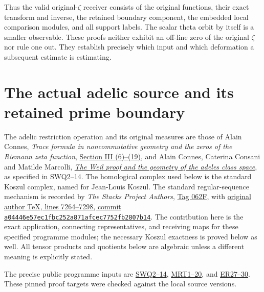 \documentclass[11pt]{article}
\begin{document}
Thus the valid original-$\zeta$ receiver consists of the original
functions, their exact transform and inverse, the retained boundary
component, the embedded local comparison modules, and all support
labels. The scalar theta orbit by itself is a smaller observable.
These proofs neither exhibit an off-line zero of the original
$\zeta$ nor rule one out. They establish precisely which input and
which deformation a subsequent estimate is estimating.

\clearpage

\section{The actual adelic source and its retained prime boundary}
\label{sec:independent-adelic-coinvariant-bridge}

The adelic restriction operation and its original measures are those of
Alain Connes, \emph{Trace formula in noncommutative geometry and the zeros
of the Riemann zeta function},
\href{https://arxiv.org/abs/math/9811068v1}{Section III (6)--(19)},
and Alain Connes, Caterina Consani and Matilde Marcolli,
\href{https://arxiv.org/abs/math/0703392v1}{\emph{The Weil proof and the
geometry of the adeles class space}}, as specified in SWQ2--14.
The homological complex used below is the standard Koszul complex,
named for Jean-Louis Koszul. The standard regular-sequence mechanism is
recorded by \emph{The Stacks Project Authors},
\href{https://stacks.math.columbia.edu/tag/062F}{Tag 062F}, with
\href{https://github.com/stacks/stacks-project/blob/a04446e57ec1fbc252a871afcec7752fb2807b14/more-algebra.tex#L7264}{original
author TeX, lines 7264--7298, commit
\texttt{a04446e57ec1fbc252a871afcec7752fb2807b14}}.
The contribution here is the exact application, connecting representatives,
and receiving maps for these specified programme modules; the necessary
Koszul exactness is proved below as well. All tensor products and
quotients below are algebraic unless a different meaning is explicitly
stated.

The precise public programme inputs are
\href{https://github.com/KokunoYumeto/zeta-function-research-reader/blob/acd7016b8232a56f31ae3e69fb800571e8789080/workbenches/splitzero-tandem/continuations/20260923-retained-source-readers/original-zeta-full-boundary/CC_WEIL_BOUNDARY_READER.tex#L927}{SWQ2--14},
\href{https://github.com/KokunoYumeto/zeta-function-research-reader/blob/acd7016b8232a56f31ae3e69fb800571e8789080/workbenches/splitzero-tandem/continuations/20260923-retained-source-readers/original-zeta-full-support/MASS_THETA_PRIME_RECEIVER.tex#L12}{MRT1--20}, and
\href{https://github.com/KokunoYumeto/zeta-function-research-reader/blob/acd7016b8232a56f31ae3e69fb800571e8789080/workbenches/splitzero-tandem/continuations/20260923-retained-source-readers/endpoint-resonance/ENDPOINT_RESONANCE_AND_PRIME_CLASS.tex#L430}{ER27--30}.
These pinned proof targets were checked against the local source versions.
\end{document}
